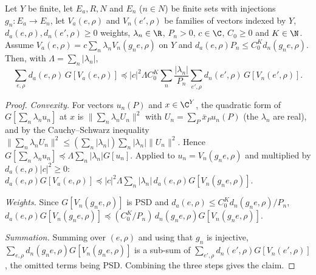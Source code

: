 \begin{lemma}\label{pf:thmS-carrier:topkernel}
Let $Y$ be finite, let $E_a,R,N$ and $E_n$ ($n\in N$) be finite sets with injections $g_n\colon E_a\to E_n$, let
$V_a(e,\rho)$ and $V_n(e',\rho)$ be families of vectors indexed by $Y$, $d_a(e,\rho),d_n(e',\rho)\ge0$ weights, $\lambda_n\in
\R$, $P_n>0$, $c\in\C$, $C_0\ge0$ and $K\in\N$. Assume $V_a(e,\rho)=c\sum_n\lambda_nV_n(g_ne,\rho)$ on $Y$ and
$d_a(e,\rho)P_n\le C_0^Kd_n(g_ne,\rho)$. Then, with $\Lambda=\sum_n|\lambda_n|$,
\[
\sum_{e,\rho}d_a(e,\rho)\,G[V_a(e,\rho)]\preceq|c|^2\Lambda C_0^K\sum_n\frac{|\lambda_n|}{P_n}\sum_{e',\rho}d_n(e',\rho)\,
G[V_n(e',\rho)] .
\]
\end{lemma}

\begin{proof}
\emph{Convexity.} For vectors $u_n(P)$ and $x\in\C^Y$, the quadratic form of $G[\sum_n\lambda_nu_n]$ at $x$ is
$\|\sum_n\lambda_nU_n\|^2$ with $U_n=\sum_P\bar x_Pu_n(P)$ (the $\lambda_n$ are real), and by the Cauchy--Schwarz
inequality $\|\sum_n\lambda_nU_n\|^2\le(\sum_n|\lambda_n|)\sum_n|\lambda_n|\|U_n\|^2$. Hence
$G[\sum_n\lambda_nu_n]\preceq\Lambda\sum_n|\lambda_n|G[u_n]$. Applied to $u_n=V_n(g_ne,\rho)$ and multiplied by
$d_a(e,\rho)|c|^2\ge0$:
$d_a(e,\rho)G[V_a(e,\rho)]\preceq|c|^2\Lambda\sum_n|\lambda_n|\,d_a(e,\rho)G[V_n(g_ne,\rho)]$.

\emph{Weights.} Since $G[V_n(g_ne,\rho)]$ is PSD and $d_a(e,\rho)\le C_0^Kd_n(g_ne,\rho)/P_n$,
$d_a(e,\rho)G[V_n(g_ne,\rho)]\preceq(C_0^K/P_n)\,d_n(g_ne,\rho)G[V_n(g_ne,\rho)]$.

\emph{Summation.} Summing over $(e,\rho)$ and using that $g_n$ is injective, $\sum_{e,\rho}d_n(g_ne,\rho)G[V_n(g_ne,\rho)]$ is
a sub-sum of $\sum_{e',\rho}d_n(e',\rho)G[V_n(e',\rho)]$, the omitted terms being PSD. Combining the three steps gives the
claim.
\end{proof}


